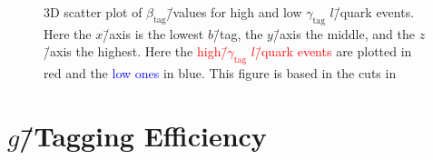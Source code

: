 \begin{figure}[h!]
  \centering
  \vspace{2mm}
  \caption[3D Scatter Plot of $\beta_\mathrm{tag}$\=/Values for High and Low $\gamma_\mathrm{tag}$ $l$\=/Quark Events]{
    3D scatter plot of $\beta_\mathrm{tag}$\=/values for high and low $\gamma_\mathrm{tag}$ $l$\=/quark events. Here the $x$\=/axis is the lowest $b$\=/tag, the $y$\=/axis
  the middle, and the $z$\=/axis the highest. Here the \textcolor{red}{high\=/$\gamma_\mathrm{tag}$ $l$\=/quark events} are plotted in red and the \textcolor{blue}{low ones} in blue. This figure is based in the cuts in }
  \label{fig:q:gtag_scores_3j_l_quarks_3d}%
\end{figure}

\section[g-Tagging Efficiency]{$g$\=/Tagging Efficiency}
\label{sec:q:g_tagging_effiency}

